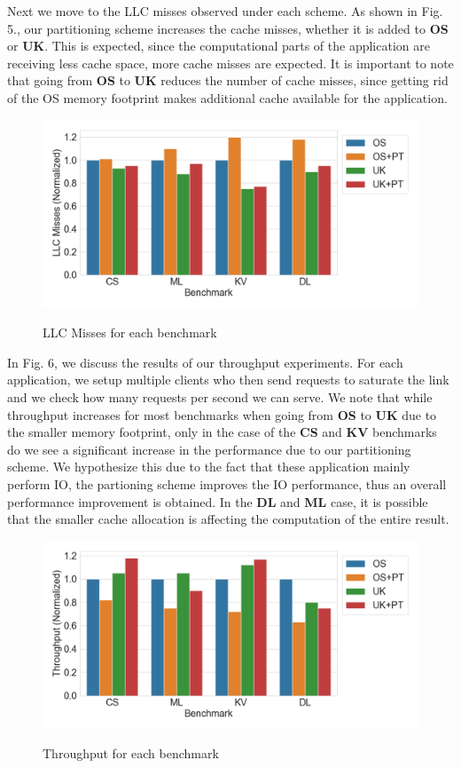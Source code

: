 \documentclass[sigconf,authorversion,noacm]{acmart}
\begin{document}
Next we move to the LLC misses observed under each scheme. As shown in Fig. 5.,
our partitioning scheme increases the cache misses, whether it is added to
\textbf{OS} or \textbf{UK}. This is expected, since the computational parts of
the application are receiving less cache space, more cache misses are expected.
It is important to note that going from \textbf{OS} to \textbf{UK} reduces the
number of cache misses, since getting rid of the OS memory footprint makes
additional cache available for the application.

\begin{figure}[h]
  \centering
  \includegraphics[width=\linewidth]{res2}
    \label{fig:motivating}
    \vspace{-2em}
    \caption{LLC Misses for each benchmark}
\end{figure}

In Fig. 6, we discuss the results of our throughput experiments. For each
application, we setup multiple clients who then send requests to saturate the
link and we check how many requests per second we can serve. We note that while
throughput increases for most benchmarks when going from \textbf{OS} to
\textbf{UK} due to the smaller memory footprint, only in the case of the
\textbf{CS} and \textbf{KV} benchmarks do we see a significant increase in the
performance due to our partitioning scheme. We hypothesize this due to the fact
that these application mainly perform IO, the partioning scheme improves the IO
performance, thus an overall performance improvement is obtained. In the
\textbf{DL} and \textbf{ML} case, it is possible that the smaller cache
allocation is affecting the computation of the entire result.

\begin{figure}[h]
  \centering
  \includegraphics[width=\linewidth]{res3}
    \label{fig:motivating}
    \vspace{-2em}
    \caption{Throughput for each benchmark}
\end{figure}
\end{document}
